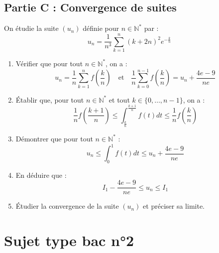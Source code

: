 \subsection*{Partie C : Convergence de suites}
On étudie la suite $(u_{n})$ définie pour $n \in \mathbb{N}^*$ par :
\begin{equation*}
	u_{n} = \frac{1}{n^{3}} \sum_{k=1}^{n} (k+2n)^{2} e^{-\frac{k}{n}}
\end{equation*}
\begin{enumerate}
	\item Vérifier que pour tout $n \in \mathbb{N}^*$, on a :
	\begin{equation*}
		u_{n} = \frac{1}{n} \sum_{k=1}^{n} f\left(\frac{k}{n}\right) \quad \text{et} \quad \frac{1}{n} \sum_{k=0}^{n-1} f\left(\frac{k}{n}\right) = u_{n} + \frac{4e-9}{ne}
	\end{equation*}
	\item Établir que, pour tout $n \in \mathbb{N}^*$ et tout $k \in \{0, \dots, n-1\}$, on a :
	\begin{equation*}
		\frac{1}{n}f\left(\frac{k+1}{n}\right) \le \int_{\frac{k}{n}}^{\frac{k+1}{n}} f(t)dt \le \frac{1}{n}f\left(\frac{k}{n}\right)
	\end{equation*}
	\item Démontrer que pour tout $n \in \mathbb{N}^*$ :
	\begin{equation*}
		u_{n} \le \int_{0}^{1} f(t)dt \le u_{n} + \frac{4e-9}{ne}
	\end{equation*}
	\item En déduire que :
	\begin{equation*}
		I_{1} - \frac{4e-9}{ne} \le u_{n} \le I_{1}
	\end{equation*}
	\item Étudier la convergence de la suite $(u_{n})$ et préciser sa limite.
\end{enumerate}




\section*{Sujet type bac n°2}

